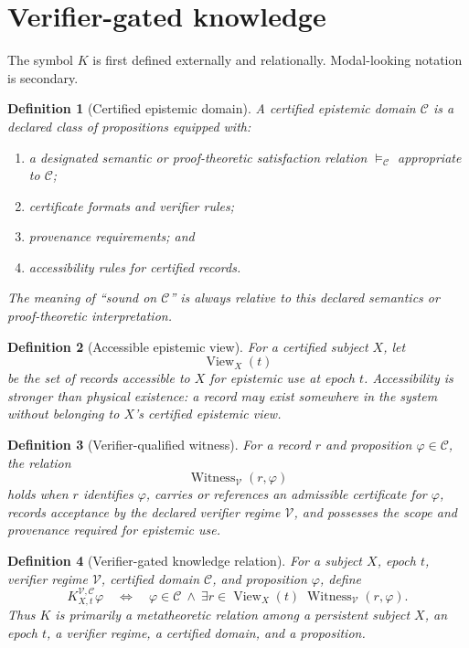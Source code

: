 \documentclass[11pt]{article}
\newtheorem{definition}{Definition}[section]
\theoremstyle{remark}
\newcommand{\View}{\operatorname{View}}
\newcommand{\Witness}{\operatorname{Witness}}
\newcommand{\Sem}{\models_{\mathcal C}}
\newcommand{\K}[4]{K^{#3,#4}_{#1,#2}}
\begin{document}
\section{Verifier-gated knowledge}

The symbol $K$ is first defined externally and relationally. Modal-looking notation is secondary.

\begin{definition}[Certified epistemic domain]
A certified epistemic domain $\mathcal C$ is a declared class of propositions equipped with:
\begin{enumerate}[label=(\roman*)]
\item a designated semantic or proof-theoretic satisfaction relation $\Sem$ appropriate to $\mathcal C$;
\item certificate formats and verifier rules;
\item provenance requirements; and
\item accessibility rules for certified records.
\end{enumerate}
The meaning of ``sound on $\mathcal C$'' is always relative to this declared semantics or proof-theoretic interpretation.
\end{definition}

\begin{definition}[Accessible epistemic view]
For a certified subject $X$, let
\[
\View_X(t)
\]
be the set of records accessible to $X$ for epistemic use at epoch $t$. Accessibility is stronger than physical existence: a record may exist somewhere in the system without belonging to $X$'s certified epistemic view.
\end{definition}

\begin{definition}[Verifier-qualified witness]
For a record $r$ and proposition $\varphi\in\mathcal C$, the relation
\[
\Witness_{\mathcal V}(r,\varphi)
\]
holds when $r$ identifies $\varphi$, carries or references an admissible certificate for $\varphi$, records acceptance by the declared verifier regime $\mathcal V$, and possesses the scope and provenance required for epistemic use.
\end{definition}

\begin{definition}[Verifier-gated knowledge relation]
For a subject $X$, epoch $t$, verifier regime $\mathcal V$, certified domain $\mathcal C$, and proposition $\varphi$, define
\[
\K{X}{t}{\mathcal V}{\mathcal C}\varphi
\quad\Longleftrightarrow\quad
\varphi\in\mathcal C\ \land\ \exists r\in\View_X(t)\;\Witness_{\mathcal V}(r,\varphi).
\]
Thus $K$ is primarily a metatheoretic relation among a persistent subject $X$, an epoch $t$, a verifier regime, a certified domain, and a proposition.
\end{definition}
\end{document}
